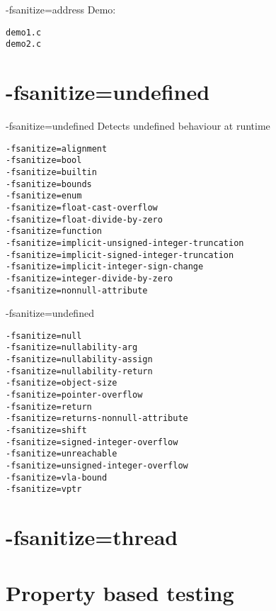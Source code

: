 \documentclass[10pt]{beamer}
\begin{document}
\begin{frame}[fragile]{-fsanitize=address}
  Demo:

  \begin{verbatim}demo1.c
demo2.c\end{verbatim}

\end{frame}

\section{-fsanitize=undefined}

\begin{frame}[fragile]{-fsanitize=undefined}
  Detects undefined behaviour at runtime

  \begin{verbatim}-fsanitize=alignment
-fsanitize=bool
-fsanitize=builtin
-fsanitize=bounds
-fsanitize=enum
-fsanitize=float-cast-overflow
-fsanitize=float-divide-by-zero
-fsanitize=function
-fsanitize=implicit-unsigned-integer-truncation
-fsanitize=implicit-signed-integer-truncation
-fsanitize=implicit-integer-sign-change
-fsanitize=integer-divide-by-zero
-fsanitize=nonnull-attribute
\end{verbatim}

\end{frame}

\begin{frame}[fragile]{-fsanitize=undefined}

  \begin{verbatim}-fsanitize=null
-fsanitize=nullability-arg
-fsanitize=nullability-assign
-fsanitize=nullability-return
-fsanitize=object-size
-fsanitize=pointer-overflow
-fsanitize=return
-fsanitize=returns-nonnull-attribute
-fsanitize=shift
-fsanitize=signed-integer-overflow
-fsanitize=unreachable
-fsanitize=unsigned-integer-overflow
-fsanitize=vla-bound
-fsanitize=vptr\end{verbatim}

\end{frame}

\section{-fsanitize=thread}

\section{Property based testing}
\end{document}
